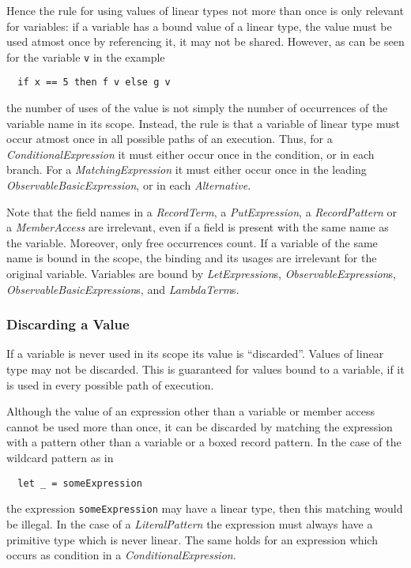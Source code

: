 \documentclass[a4paper]{report}
\newcommand{\code}[1]{\textnormal{\texttt{#1}}}
\begin{document}
Hence the rule for using values of linear types not more than once is only relevant for variables: 
if a variable has a 
bound value of a linear type, the value must be used atmost once by referencing it, it may not be shared. However, 
as can be seen for the variable \code{v} in the example
\begin{verbatim}
  if x == 5 then f v else g v
\end{verbatim}
the number of uses of the value is not simply the number of occurrences of the variable name in its scope. \cbstart Instead,
the rule is that a variable of linear type must occur atmost once in all possible paths of an execution. Thus,
for a \textit{ConditionalExpression} it must either occur once in the condition, or in each branch. For
a \textit{MatchingExpression} it must either occur once in the leading 
\textit{ObservableBasicExpression}, or in each \textit{Alternative}.

Note that the field names in a \textit{RecordTerm}, a \textit{PutExpression}, a \textit{RecordPattern} or a
\textit{MemberAccess} are irrelevant, even if a field is present with the same name as the variable. Moreover,
only free occurrences count. If a variable of the same name is bound in the scope, the binding and its usages
are irrelevant for the original variable. Variables are bound by \textit{LetExpression}s, 
\textit{ObservableExpression}s, \textit{ObservableBasicExpression}s, and \textit{LambdaTerm}s.
\cbend

\subsubsection{Discarding a Value}

\cbstart
If a variable is never used in its scope its value is ``discarded''. Values of linear type
may not be discarded. This is guaranteed for values bound to a variable, if it is used in every possible path of 
execution. 
\cbend

Although the value of an expression other than a variable or member access cannot be used more than once, it can be discarded
by matching the expression with a pattern other than a variable or a boxed record pattern. In the case of the wildcard pattern 
as in
\begin{verbatim}
  let _ = someExpression
\end{verbatim}
the expression \code{someExpression} may have a linear type, then this matching would be illegal. In the case of a 
\textit{LiteralPattern} the expression must always have a primitive type which is never linear. The same holds for an expression
which occurs as condition in a \textit{ConditionalExpression}. 
\end{document}
